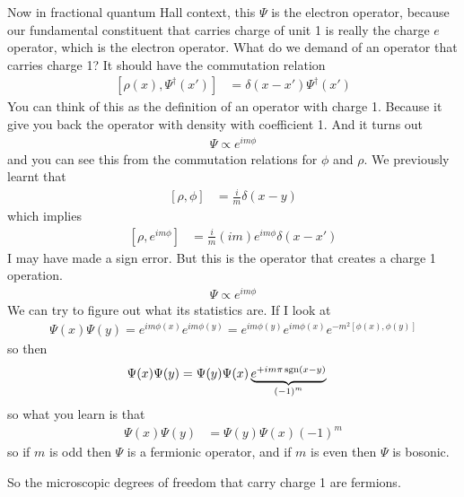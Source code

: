 Now in fractional quantum Hall context,
this $\Psi$ is the electron operator,
because our fundamental constituent that carries charge of unit 1 is really the
charge $e$ operator,
which is the electron operator.
What do we demand of an operator that carries charge 1?
It should have the commutation relation
\begin{align}
    \left[ \rho(x), \Psi^\dagger\left( x' \right) \right]
    &=
    \delta\left( x - x' \right)\Psi^\dagger(x')
\end{align}
You can think of this as the definition of an operator with charge 1.
Because it give you back the operator with density with coefficient 1.
And it turns out
\begin{align}
    \Psi \propto e^{im\phi}
\end{align}
and you can see this from the commutation relations for $\phi$ and $\rho$.
We previously learnt that
\begin{align}
    \left[ \rho, \phi \right]
    &=
    \frac{i}{m}
    \delta\left( x - y \right)
\end{align}
which implies
\begin{align}
    \left[ \rho, e^{im\phi} \right]
    &=
    \frac{i}{m}
    \left( im \right)
    e^{im\phi}
    \delta\left( x - x' \right)
\end{align}
I may have made a sign error.
But this is the operator that creates a charge 1 operation.
\begin{align}
    \Psi \propto e^{im\phi}
\end{align}
We can try to figure out what its statistics are.
If I look at
\begin{align}
    \Psi(x)\Psi(y)
    =
    e^{im\phi(x)}
    e^{im\phi(y)}
    =
    e^{im\phi(y)}
    e^{im\phi(x)}
    e^{-m^2\left[ \phi(x), \phi(y) \right]}
\end{align}
so then
\begin{align}
    \Psi(x) \Psi(y)
    &=
    \Psi(y) \Psi(x)
    \underbrace{e^{+im\pi \operatorname{sgn}(x - y)}}_{
    \left( -1 \right)^m
    }
\end{align}
so what you learn is that
\begin{align}
    \Psi(x) \Psi(y)
    &=
    \Psi(y) \Psi(x)
    (-1)^m
\end{align}
so if $m$ is odd then $\Psi$ is a fermionic operator,
and if $m$ is even then $\Psi$ is bosonic.

So the microscopic degrees of freedom that carry charge 1 are fermions.

